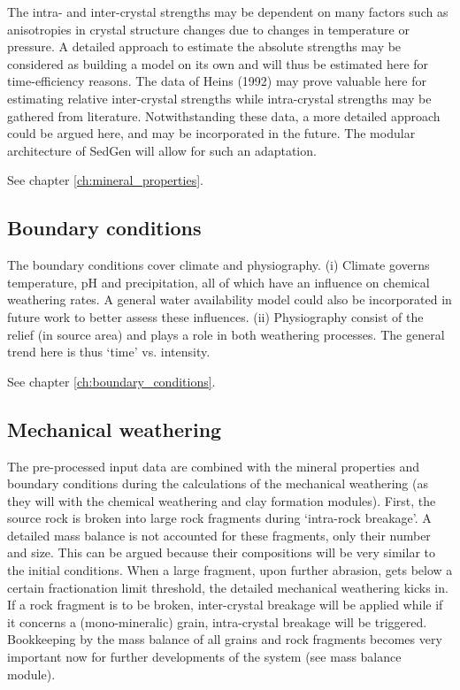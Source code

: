     The intra- and inter-crystal strengths may be dependent on many factors such as anisotropies in crystal structure changes due to changes in temperature or pressure. %
    A detailed approach to estimate the absolute strengths may be considered as building a model on its own and will thus be estimated here for time-efficiency reasons. %
    The data of Heins (1992) may prove valuable here for estimating relative inter-crystal strengths while intra-crystal strengths may be gathered from literature. %
    Notwithstanding these data, a more detailed approach could be argued here, and may be incorporated in the future. %
    The modular architecture of SedGen will allow for such an adaptation. %

    See chapter \ref{ch:mineral_properties}. %

    \subsection{Boundary conditions}
    The boundary conditions cover climate and physiography. %
    (i) Climate governs temperature, pH and precipitation, all of which have an influence on chemical weathering rates. %
    A general water availability model could also be incorporated in future work to better assess these influences. %
    (ii) Physiography consist of the relief (in source area) and plays a role in both weathering processes. %
    The general trend here is thus ‘time’ vs. intensity.%

    See chapter \ref{ch:boundary_conditions}. %

    \subsection{Mechanical weathering}
    The pre-processed input data are combined with the mineral properties and boundary conditions during the calculations of the mechanical weathering (as they will with the chemical weathering and clay formation modules). %
    First, the source rock is broken into large rock fragments during ‘intra-rock breakage’. %
    A detailed mass balance is not accounted for these fragments, only their number and size. %
    This can be argued because their compositions will be very similar to the initial conditions. %
    When a large fragment, upon further abrasion, gets below a certain fractionation limit threshold, the detailed mechanical weathering kicks in. %
    If a rock fragment is to be broken, inter-crystal breakage will be applied while if it concerns a (mono-mineralic) grain, intra-crystal breakage will be triggered. %
    Bookkeeping by the mass balance of all grains and rock fragments becomes very important now for further developments of the system (see mass balance module). %

